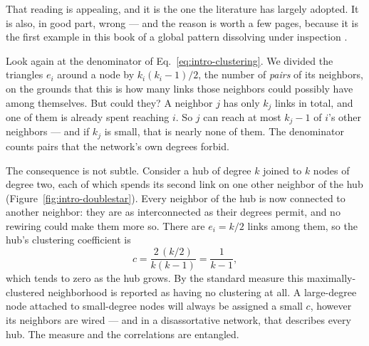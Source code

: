 That reading is appealing, and it is the one the literature has largely adopted.
It is also, in good part, wrong --- and the reason is worth a few pages, because
it is the first example in this book of a global pattern dissolving under
inspection \citep{soffer2005}.

Look again at the denominator of Eq.~\eqref{eq:intro-clustering}. We divided the
triangles $e_i$ around a node by $k_i(k_i-1)/2$, the number of \emph{pairs} of its
neighbors, on the grounds that this is how many links those neighbors could
possibly have among themselves. But could they? A neighbor $j$ has only $k_j$
links in total, and one of them is already spent reaching $i$. So $j$ can reach at
most $k_j-1$ of $i$'s other neighbors --- and if $k_j$ is small, that is nearly
none of them. The denominator counts pairs that the network's own degrees forbid.

The consequence is not subtle. Consider a hub of degree $k$ joined to $k$ nodes of
degree two, each of which spends its second link on one other neighbor of the hub
(Figure~\ref{fig:intro-doublestar}). Every neighbor of the hub is now connected to
another neighbor: they are as interconnected as their degrees permit, and no
rewiring could make them more so. There are $e_i=k/2$ links among them, so the
hub's clustering coefficient is
\begin{equation}
  c = \frac{2\,(k/2)}{k(k-1)} = \frac{1}{k-1},
  \label{eq:intro-hubc}
\end{equation}
which tends to zero as the hub grows. By the standard
measure this maximally-clustered neighborhood is reported as having no clustering
at all. A large-degree node attached to small-degree nodes will always be assigned
a small $c$, however its neighbors are wired --- and in a disassortative network,
that describes every hub. The measure and the correlations are entangled.

